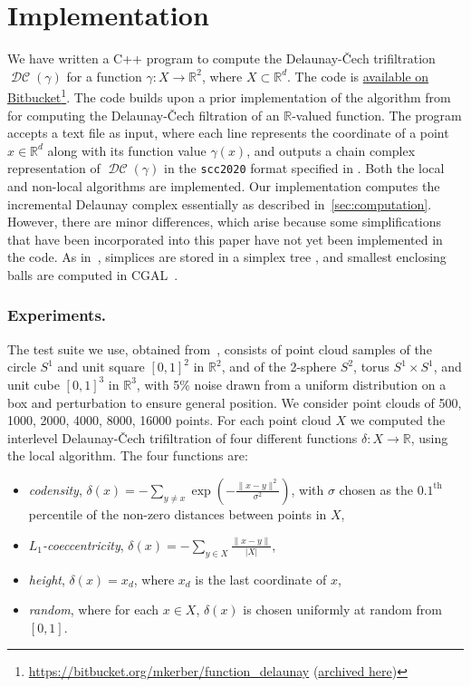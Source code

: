 \documentclass[11pt]{amsart}
\newcommand{\R}{\mathbb{R}} %
\DeclareMathOperator{\DelCech}{\mathcal{DC}}
\renewcommand{\subparagraph}[1]{\subsubsection*{\textbf{\textup{#1}}}}
\theoremstyle{plain}
\theoremstyle{definition}
\theoremstyle{remark}
\begin{document}
\section{Implementation}\label{sec:implement}
We have written a C++ program to compute the Delaunay-\v{C}ech trifiltration $\DelCech(\gamma)$ for a function $\gamma: X \to \R^2$, where $X\subset \R^d$. 
The code is
\href{https://bitbucket.org/mkerber/function_delaunay}{available on Bitbucket}\footnote{
\url{https://bitbucket.org/mkerber/function_delaunay} (\href{https://archive.softwareheritage.org/swh:1:dir:95fb3611456975ff368b3cfb5604f4bd9011264e;origin=https://bitbucket.org/mkerber/function_delaunay;visit=swh:1:snp:8ce3f15de54bedbe074deeba25703bdb373e71e3;anchor=swh:1:rev:a481f8d90af7a97795c467d81fb3db2cf952a58e}{archived here})}.  
The code builds upon a prior implementation of the algorithm from \cite{alonsoDelaunayBifiltrationsFunctions2024} for computing the Delaunay-\v{C}ech filtration of an $\R$-valued function.  The program accepts a text file as input, where each line represents the coordinate of a
point $x \in \R^d$ along with its function value $\gamma(x)$, and outputs a chain complex representation of 
$\DelCech(\gamma)$ in the \texttt{scc2020} format specified in
\cite{scc2020}.    Both the local and non-local algorithms are implemented.  
Our implementation computes the incremental Delaunay complex essentially as described in~\cref{sec:computation}.  However, there are minor differences, which arise because some simplifications that have been incorporated into this paper have not yet been implemented in the code.  
As in~\cite{alonsoDelaunayBifiltrationsFunctions2024},  simplices are stored in a
simplex tree \cite{boissonnat2014simplextree, gudhi:FilteredComplexes}, 
and smallest enclosing balls are computed in CGAL~\cite{cgal:fghhs-bv-24a}.
%
%
%
\subparagraph{Experiments.} The test suite we use, obtained from~\cite{kerber_2025_rxedk-qyq77}, consists of point cloud samples of the circle $S^1$ and unit square $[0, 1]^2$ in $\R^2$, and of the 2-sphere $S^2$, torus $S^1 \times S^1$, and unit cube $[0, 1]^3$ in $\R^3$, with 5\% noise drawn from a uniform distribution on a box and perturbation to ensure general position.  We consider point clouds of 500, 1000, 2000, 4000, 8000, 16000 points.
%
For each point cloud $X$ we computed the interlevel Delaunay-\v{C}ech trifiltration of four different functions $\delta: X \to \R$, using the local algorithm.  
The four functions are:
\begin{itemize}
    \item \emph{codensity},
    $\delta(x) = -\sum\limits_{y\neq x}{\exp{\left(-\frac{\|x-y\|^2}{\sigma^2}\right)}}$,
    with $\sigma$ chosen as the $0.1^{\mathrm{th}}$ percentile of the non-zero distances between points in $X$, 
    \item \emph{$L_1$-coeccentricity},
    $\delta (x) = -\sum\limits_{y\in X}{\frac{\|x-y\|}{|X|}}$,
    \item \emph{height}, $\delta(x) = x_d$, where $x_d$ is the last coordinate of $x$,
    \item \emph{random}, where for each $x\in X$, $\delta(x)$ is chosen uniformly at random from $[0,1]$.
\end{itemize}
\end{document}
